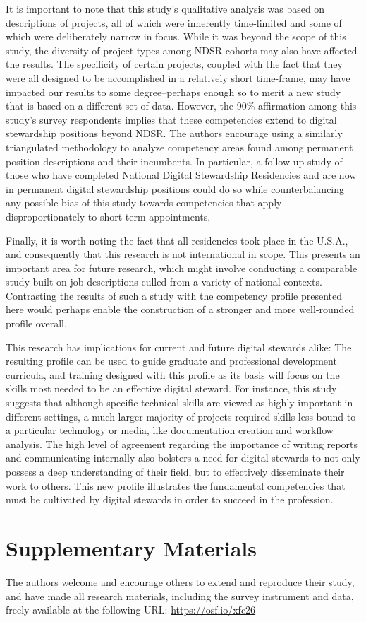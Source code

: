\documentclass{acm_proc_article-sp}
\begin{document}
It is important to note that this study's qualitative analysis was based on descriptions of projects, all of which were inherently time-limited and some of which were deliberately narrow in focus. While it was beyond the scope of this study, the diversity of project types among NDSR cohorts may also have affected the results. The specificity of certain projects, coupled with the fact that they were all designed to be accomplished in a relatively short time-frame, may have impacted our results to some degree--perhaps enough so to merit a new study that is based on a different set of data. However, the 90\% affirmation among this study's survey respondents implies that these competencies extend to digital stewardship positions beyond NDSR. The authors encourage using a similarly triangulated methodology to analyze competency areas found among permanent position descriptions and their incumbents. In particular, a follow-up study of those who have completed National Digital Stewardship Residencies and are now in permanent digital stewardship positions could do so while counterbalancing any possible bias of this study towards competencies that apply disproportionately to short-term appointments. 

Finally, it is worth noting the fact that all residencies took place in the U.S.A., and consequently that this research is not international in scope. This presents an important area for future research, which might involve conducting a comparable study built on job descriptions culled from a variety of national contexts. Contrasting the results of such a study with the competency profile presented here would perhaps enable the construction of a stronger and more well-rounded profile overall.

This research has implications for current and future digital stewards alike: The resulting profile can be used to guide graduate and professional development curricula, and training designed with this profile as its basis will focus on the skills most needed to be an effective digital steward. For instance, this study suggests that although specific technical skills are viewed as highly important in different settings, a much larger majority of projects required skills less bound to a particular technology or media, like documentation creation and workflow analysis. The high level of agreement regarding the importance of writing reports and communicating internally also bolsters a need for digital stewards to not only possess a deep understanding of their field, but to effectively disseminate their work to others. This new profile illustrates the fundamental competencies that must be cultivated by digital stewards in order to succeed in the profession. 

\section{Supplementary Materials}
The authors welcome and encourage others to extend and reproduce their study, and have made all research materials, including the survey instrument and data, freely available at the following URL: \url{https://osf.io/xfc26}

 


\end{document}
